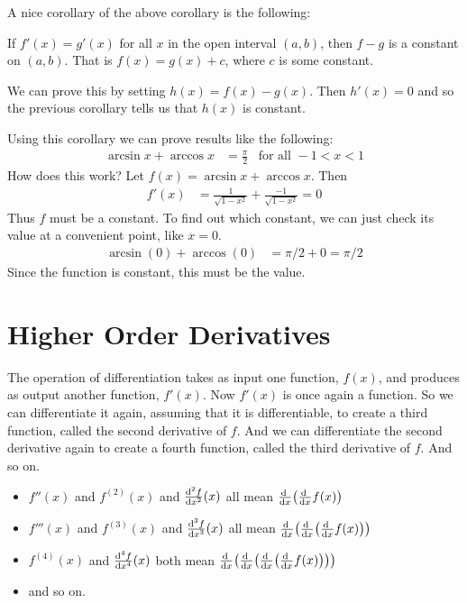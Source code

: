 A nice corollary of the above corollary is the following:
\begin{cor}\label{cor equal diff}
If $f'(x) = g'(x)$ for all $x$ in the open interval $(a,b)$, then $f-g$ is a constant on
$(a,b)$. That is $f(x)=g(x)+c$, where $c$ is some constant.
\end{cor}
We can prove this by setting $h(x)=f(x)-g(x)$. Then $h'(x)=0$ and so the previous
corollary tells us that $h(x)$ is constant.

\begin{eg}
Using this corollary we can prove results like the following:
\begin{align*}
  \arcsin x + \arccos x &= \frac{\pi}{2} & \mbox{for all } -1 < x < 1
\end{align*}
How does this work? Let $f(x) = \arcsin x + \arccos x$. Then
\begin{align*}
  f'(x) &= \frac{1}{\sqrt{1-x^2}} + \frac{-1}{\sqrt{1-x^2}} = 0
\end{align*}
Thus $f$ must be a constant. To find out which constant, we can just check its value at a
convenient point, like $x=0$.
\begin{align*}
  \arcsin(0) + \arccos(0) &= \pi/2 + 0 = \pi/2
\end{align*}
Since the function is constant, this must be the value.
\end{eg}


\section{Higher Order Derivatives}\label{sec higher diff}

The operation of differentiation takes as input one function,
$f(x)$, and produces as output another function, $f'(x)$. Now $f'(x)$ is
once again a function. So we can differentiate it again, assuming that
it is differentiable, to create a third function, called the second
derivative of $f$. And we can differentiate the second derivative again
to create a fourth function, called the third derivative of $f$.
And so on.
\begin{notn}\label{not:higherOrdDeriv}
\begin{itemize}
\item $f''(x)$ and $f^{(2)}(x)$  and $\frac{\mathrm{d}^2f}{\mathrm{d}{x}^2}(x)$ all mean
$\diff{}{x}\big(\diff{}{x}f(x)\big)$
\item $f'''(x)$ and $f^{(3)}(x)$  and $\frac{\mathrm{d}^3f}{\mathrm{d}{x}^3}(x)$ all mean
$\diff{}{x}\big(\diff{}{x}\big(\diff{}{x}f(x)\big)\big)$
\item $f^{(4)}(x)$  and $\frac{\mathrm{d}^4f}{\mathrm{d}{x}^4}(x)$ both mean
$\diff{}{x}\big(\diff{}{x}\big(\diff{}{x}\big(\diff{}{x}f(x)\big)\big)\big)$
\item and so on.
\end{itemize}
\end{notn}

